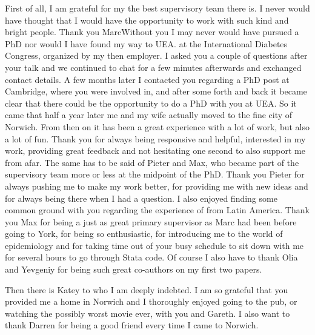 First of all, I am grateful for my the best supervisory team there is. I never would have thought that I would have the opportunity to work with such kind and bright people. Thank you Marc\DIFdelbegin {}\DIFdelend \DIFaddbegin \DIFadd{! }\DIFaddend Without you I may never would have pursued a PhD nor would I have found my way to UEA. \DIFdelbegin {}\DIFdelend \DIFaddbegin {}\DIFaddend at the International Diabetes Congress, organized by my then employer. I asked you a couple of questions after your talk and we continued to chat for a few minutes afterwards and exchanged contact details. A few months later I contacted you regarding a PhD post at Cambridge, where you were involved in, and after some forth and back it became clear that there could be the opportunity to do a PhD with you at UEA. So it came that half a year later me and my wife actually moved to the fine city of Norwich\DIFdelbegin {}\DIFdelend . From then on it has been a great experience with a lot of work, but also a lot of fun. Thank you for always being responsive and helpful, interested in my work, providing great feedback and not hesitating one second to also support me from afar. The same has to be said of Pieter and Max, who became part of the supervisory team more or less at the midpoint of the PhD. Thank you Pieter for always pushing me to make my work better, for providing me with new ideas and for always being there when I had a question. I also enjoyed finding some common ground with you regarding the experience of \DIFdelbegin {}\DIFdelend \DIFaddbegin {}\DIFaddend from Latin America. Thank you Max for being a just as great primary supervisor as Marc had been before going to York, for being so enthusiastic, for introducing me to the world of epidemiology and for taking time out of your busy schedule to sit down with me for several hours to go through Stata code. Of course I also have to thank Olia and Yevgeniy for being such great co-authors on my first two papers. \DIFaddbegin {}\DIFaddend 

Then there is Katey	 to who I am deeply indebted. I am so grateful that you provided me a home in Norwich and I thoroughly enjoyed going to the pub, or watching the possibly worst movie ever, with you and Gareth. I also want to thank Darren for being a good friend every time I came to Norwich. 

